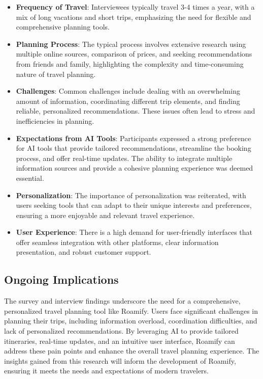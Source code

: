 \documentclass[conference]{IEEEtran}
\begin{document}
        \begin{itemize}
            \item \textbf{Frequency of Travel}: Interviewees typically travel 3-4 times a year, with a mix of long vacations and short trips, emphasizing the need for flexible and comprehensive planning tools.
            \item \textbf{Planning Process}: The typical process involves extensive research using multiple online sources, comparison of prices, and seeking recommendations from friends and family, highlighting the complexity and time-consuming nature of travel planning.
            \item \textbf{Challenges}: Common challenges include dealing with an overwhelming amount of information, coordinating different trip elements, and finding reliable, personalized recommendations. These issues often lead to stress and inefficiencies in planning.
            \item \textbf{Expectations from AI Tools}: Participants expressed a strong preference for AI tools that provide tailored recommendations, streamline the booking process, and offer real-time updates. The ability to integrate multiple information sources and provide a cohesive planning experience was deemed essential.
            \item \textbf{Personalization}: The importance of personalization was reiterated, with users seeking tools that can adapt to their unique interests and preferences, ensuring a more enjoyable and relevant travel experience.
            \item \textbf{User Experience}: There is a high demand for user-friendly interfaces that offer seamless integration with other platforms, clear information presentation, and robust customer support.
        \end{itemize}

    \subsection{Ongoing Implications}
        The survey and interview findings underscore the need for a comprehensive, personalized travel planning tool like Roamify. Users face significant challenges in planning their trips, including information overload, coordination difficulties, and lack of personalized recommendations. By leveraging AI to provide tailored itineraries, real-time updates, and an intuitive user interface, Roamify can address these pain points and enhance the overall travel planning experience. The insights gained from this research will inform the development of Roamify, ensuring it meets the needs and expectations of modern travelers.
\end{document}
